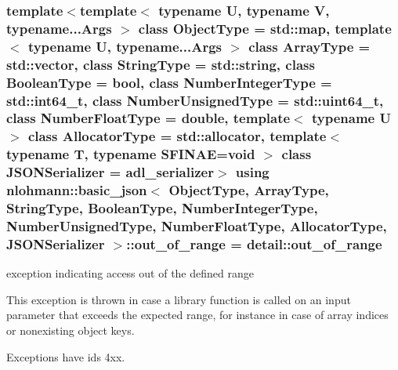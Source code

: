 \subsubsection[{\texorpdfstring{out\+\_\+of\+\_\+range}{out_of_range}}]{\setlength{\rightskip}{0pt plus 5cm}template$<$template$<$ typename U, typename V, typename...\+Args $>$ class Object\+Type = std\+::map, template$<$ typename U, typename...\+Args $>$ class Array\+Type = std\+::vector, class String\+Type  = std\+::string, class Boolean\+Type  = bool, class Number\+Integer\+Type  = std\+::int64\+\_\+t, class Number\+Unsigned\+Type  = std\+::uint64\+\_\+t, class Number\+Float\+Type  = double, template$<$ typename U $>$ class Allocator\+Type = std\+::allocator, template$<$ typename T, typename S\+F\+I\+N\+A\+E=void $>$ class J\+S\+O\+N\+Serializer = adl\+\_\+serializer$>$ using {\bf nlohmann\+::basic\+\_\+json}$<$ Object\+Type, Array\+Type, String\+Type, Boolean\+Type, Number\+Integer\+Type, Number\+Unsigned\+Type, Number\+Float\+Type, Allocator\+Type, J\+S\+O\+N\+Serializer $>$\+::{\bf out\+\_\+of\+\_\+range} =  {\bf detail\+::out\+\_\+of\+\_\+range}}\hypertarget{classnlohmann_1_1basic__json_a28f7c2f087274a0012eb7a2333ee1580}{}\label{classnlohmann_1_1basic__json_a28f7c2f087274a0012eb7a2333ee1580}


exception indicating access out of the defined range 

This exception is thrown in case a library function is called on an input parameter that exceeds the expected range, for instance in case of array indices or nonexisting object keys.

Exceptions have ids 4xx.

